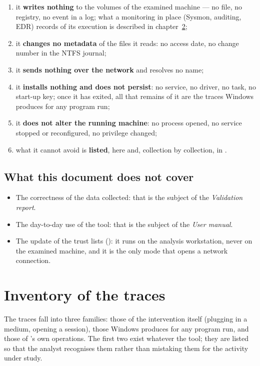 \documentclass[11pt,a4paper,oneside]{report}
\begin{document}
\begin{enumerate}
  \item it \textbf{writes nothing} to the volumes of the examined machine —
        no file, no registry, no event in a log; what a monitoring in place
        (Sysmon, auditing, EDR) records of its execution is described in
        chapter~\ref{ch:traces};
  \item it \textbf{changes no metadata} of the files it reads: no access
        date, no change number in the NTFS journal;
  \item it \textbf{sends nothing over the network} and resolves no name;
  \item it \textbf{installs nothing and does not persist}: no service, no
        driver, no task, no start-up key; once it has exited, all that remains
        of it are the traces Windows produces for any program run;
  \item it \textbf{does not alter the running machine}: no process opened, no
        service stopped or reconfigured, no privilege changed;
  \item what it cannot avoid is \textbf{listed}, here and, collection by
        collection, in .
\end{enumerate}

\section{What this document does not cover}

\begin{itemize}
  \item The correctness of the data collected: that is the subject of the
        \emph{Validation report}.
  \item The day-to-day use of the tool: that is the subject of the \emph{User
        manual}.
  \item The update of the trust lists (): it runs on the
        analysis workstation, never on the examined machine, and it is the
        only mode that opens a network connection.
\end{itemize}

\chapter{Inventory of the traces}\label{ch:traces}

The traces fall into three families: those of the intervention itself
(plugging in a medium, opening a session), those Windows produces for any
program run, and those of \wac{}'s own operations. The first two exist
whatever the tool; they are listed so that the analyst recognises them rather
than mistaking them for the activity under study.
\end{document}
